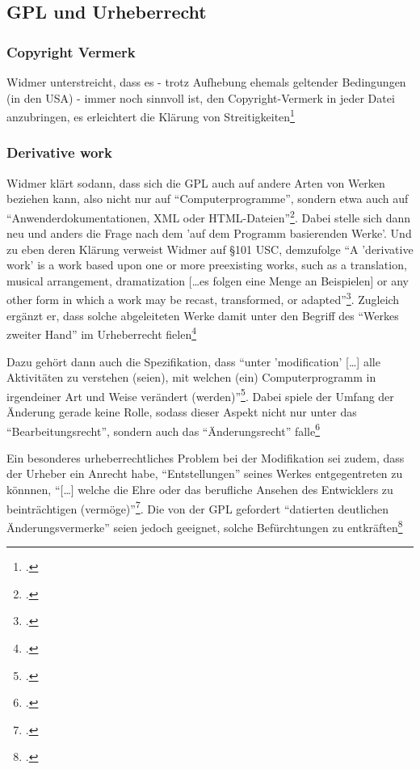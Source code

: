 \documentclass[DIV=calc,BCOR=5mm,11pt,headings=small,oneside,abstract=true, toc=bib]{scrartcl}
\begin{document}
\subsection{GPL und Urheberrecht}

\subsubsection{Copyright Vermerk}
Widmer unterstreicht, dass es - trotz Aufhebung ehemals geltender Bedingungen
(in den USA) - immer noch sinnvoll ist, den Copyright-Vermerk in jeder Datei
anzubringen, es erleichtert die Klärung von
Streitigkeiten\footcite[vgl.][107]{Widmer2003a}

\subsubsection{Derivative work}

Widmer klärt sodann, dass sich die GPL auch auf andere Arten von Werken
beziehen kann, also nicht nur auf \enquote{Computerprogramme}, sondern etwa
auch auf \enquote{Anwenderdokumentationen, XML oder
HTML-Dateien}\footcite[vgl.][114]{Widmer2003a}.  Dabei stelle sich dann
neu und anders die Frage nach dem 'auf dem Programm basierenden Werke'. Und zu
eben deren Klärung verweist Widmer auf §101 USC, demzufolge \enquote{A
'derivative work' is a work based upon one or more preexisting works,
such as a translation, musical arrangement, dramatization [\ldots es
folgen eine Menge an Beispielen] or any other form in which a work may be
recast, transformed, or adapted}\footcite[vgl.][114 Anm.
540]{Widmer2003a}. Zugleich ergänzt er, dass solche abgeleiteten Werke damit
unter den Begriff des \enquote{Werkes zweiter Hand} im Urheberrecht
fielen\footcite[vgl.][114f]{Widmer2003a}

Dazu gehört dann auch die Spezifikation, dass \enquote{unter 'modification'
[\ldots] alle Aktivitäten zu verstehen (seien), mit welchen (ein)
Computerprogramm in irgendeiner Art und Weise verändert
(werden)}\footcite[vgl.][123]{Widmer2003a}. Dabei spiele der Umfang der
Änderung gerade keine Rolle, sodass dieser Aspekt nicht nur unter das
\enquote{Bearbeitungsrecht}, sondern auch das \enquote{Änderungsrecht}
falle\footcite[vgl.][124]{Widmer2003a}

Ein besonderes urheberrechtliches Problem bei der Modifikation sei zudem, dass
der Urheber ein Anrecht habe, \enquote{Entstellungen} seines Werkes
entgegentreten zu könnnen, \enquote{[\ldots] welche die Ehre oder das
berufliche Ansehen des Entwicklers zu beinträchtigen
(vermöge)}\footcite[vgl.][135]{Widmer2003a}. Die von der GPL gefordert
\enquote{datierten deutlichen Änderungsvermerke} seien jedoch geeignet,
solche Befürchtungen zu entkräften\footcite[vgl.][136]{Widmer2003a}
\end{document}
